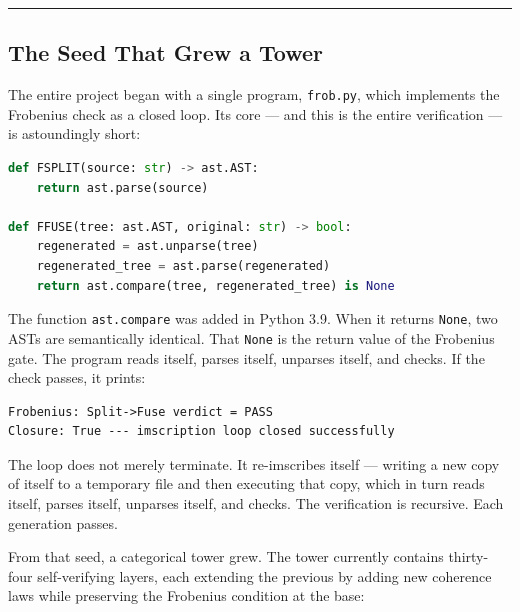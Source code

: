 \documentclass[12pt,a4paper]{article}
\begin{document}
\begin{center}
\rule{0.5\textwidth}{0.4pt}
\end{center}

\subsection{The Seed That Grew a Tower}

The entire project began with a single program, \texttt{frob.py}, which implements the Frobenius check as a closed loop. Its core --- and this is the entire verification --- is astoundingly short:

\begin{lstlisting}[language=Python]
def FSPLIT(source: str) -> ast.AST:
    return ast.parse(source)

def FFUSE(tree: ast.AST, original: str) -> bool:
    regenerated = ast.unparse(tree)
    regenerated_tree = ast.parse(regenerated)
    return ast.compare(tree, regenerated_tree) is None
\end{lstlisting}

The function \texttt{ast.compare} was added in Python 3.9. When it returns \texttt{None}, two ASTs are semantically identical. That \texttt{None} is the return value of the Frobenius gate. The program reads itself, parses itself, unparses itself, and checks. If the check passes, it prints:

\begin{lstlisting}
Frobenius: Split->Fuse verdict = PASS
Closure: True --- imscription loop closed successfully
\end{lstlisting}

The loop does not merely terminate. It re-imscribes itself --- writing a new copy of itself to a temporary file and then executing that copy, which in turn reads itself, parses itself, unparses itself, and checks. The verification is recursive. Each generation passes.

From that seed, a categorical tower grew. The tower currently contains thirty-four self-verifying layers, each extending the previous by adding new coherence laws while preserving the Frobenius condition at the base:
\end{document}

